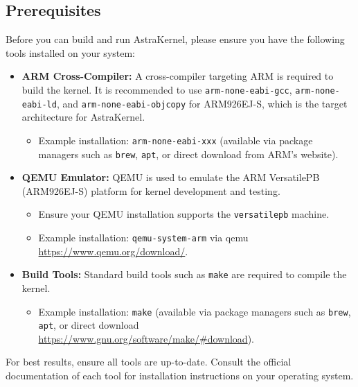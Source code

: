 
\subsection{Prerequisites}

Before you can build and run AstraKernel, please ensure you have the following 
tools installed on your system:

\begin{itemize}
  \item \textbf{ARM Cross-Compiler:}  
  A cross-compiler targeting ARM is required to build the kernel. It 
  is recommended to use \texttt{arm-none-eabi-gcc}, \texttt{arm-none-eabi-ld}, 
  and \texttt{arm-none-eabi-objcopy} for ARM926EJ-S, which is the target architecture
  for AstraKernel.
  \begin{itemize}
    \item Example installation: \texttt{arm-none-eabi-xxx} (available via package 
    managers such as \texttt{brew}, \texttt{apt}, or direct download from ARM's website).
  \end{itemize}
  
  \item \textbf{QEMU Emulator:}  
  QEMU is used to emulate the ARM VersatilePB (ARM926EJ-S) platform for kernel development and testing.
  \begin{itemize}
    \item Ensure your QEMU installation supports the \texttt{versatilepb} machine.
    \item Example installation: \texttt{qemu-system-arm} via  qemu \url{https://www.qemu.org/download/}.
  \end{itemize}

  \item \textbf{Build Tools:}  
  Standard build tools such as \texttt{make} are required to compile the kernel.
  \begin{itemize}
    \item Example installation: \texttt{make} (available via package managers 
    such as \texttt{brew}, \texttt{apt}, or direct download \url{https://www.gnu.org/software/make/#download}).
  \end{itemize}
\end{itemize}

\noindent
For best results, ensure all tools are up-to-date. Consult the official documentation 
of each tool for installation instructions on your operating system.


